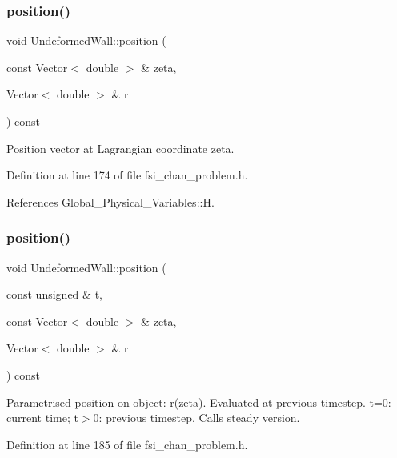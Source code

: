 \subsubsection{\texorpdfstring{position()}{position()}\hspace{0.1cm}{\footnotesize\ttfamily [1/2]}}
{\footnotesize\ttfamily void Undeformed\+Wall\+::position (\begin{DoxyParamCaption}\item[{const Vector$<$ double $>$ \&}]{zeta,  }\item[{Vector$<$ double $>$ \&}]{r }\end{DoxyParamCaption}) const\hspace{0.3cm}{\ttfamily [inline]}}



Position vector at Lagrangian coordinate zeta. 



Definition at line 174 of file fsi\+\_\+chan\+\_\+problem.\+h.



References Global\+\_\+\+Physical\+\_\+\+Variables\+::H.

\mbox{\label{classUndeformedWall_a9cbb52e30fd47d1841c1c3dc812f4b96}} 
\subsubsection{\texorpdfstring{position()}{position()}\hspace{0.1cm}{\footnotesize\ttfamily [2/2]}}
{\footnotesize\ttfamily void Undeformed\+Wall\+::position (\begin{DoxyParamCaption}\item[{const unsigned \&}]{t,  }\item[{const Vector$<$ double $>$ \&}]{zeta,  }\item[{Vector$<$ double $>$ \&}]{r }\end{DoxyParamCaption}) const\hspace{0.3cm}{\ttfamily [inline]}}



Parametrised position on object\+: r(zeta). Evaluated at previous timestep. t=0\+: current time; t$>$0\+: previous timestep. Calls steady version. 



Definition at line 185 of file fsi\+\_\+chan\+\_\+problem.\+h.



